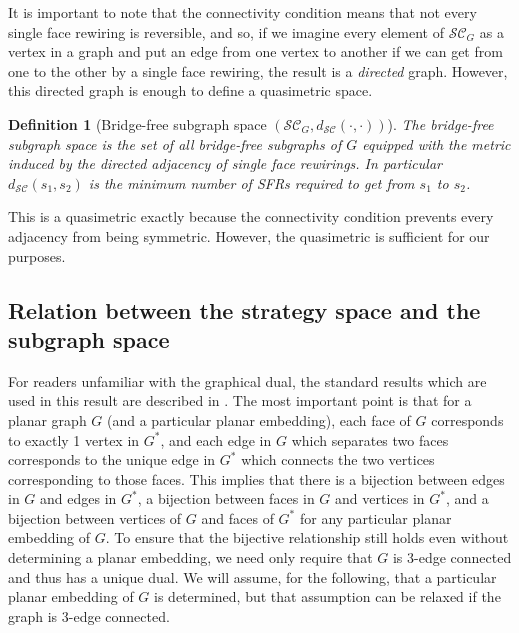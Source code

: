 \documentclass{article}
\newtheorem{definition}{Definition}[section]
\begin{document}
It is important to note that the connectivity condition means that not every single face rewiring is reversible, and so, if we imagine every element of $\mathcal{SC}_G$ as a vertex in a graph and put an edge from one vertex to another if we can get from one to the other by a single face rewiring, the result is a \textit{directed} graph. However, this directed graph is enough to define a quasimetric space. 

\begin{definition}[Bridge-free subgraph space $(\mathcal{SC}_G,d_{\mathcal{SC}}(\cdot,\cdot))$]
The bridge-free subgraph space is the set of all bridge-free subgraphs of $G$ equipped with the metric induced by the directed adjacency of single face rewirings. In particular $d_{\mathcal{SC}}(s_1,s_2)$ is the minimum number of SFRs required to get from $s_1$ to $s_2$. 
\end{definition}
This is a quasimetric exactly because the connectivity condition prevents every adjacency from being symmetric. However, the quasimetric is sufficient for our purposes.

\subsection{Relation between the strategy space and the subgraph space}

For readers unfamiliar with the graphical dual, the standard results which are used in this result are described in \cite{NishizekiPlanarGraphs}. The most important point is that for a planar graph $G$ (and a particular planar embedding), each face of $G$ corresponds to exactly 1 vertex in $G^*$, and each edge in $G$ which separates two faces corresponds to the unique edge in $G^*$ which connects the two vertices corresponding to those faces. This implies that there is a bijection between edges in $G$ and edges in $G^*$, a bijection between faces in $G$ and vertices in $G^*$, and a bijection between vertices of $G$ and faces of $G^*$ for any particular planar embedding of $G$. To ensure that the bijective relationship still holds even without determining a planar embedding, we need only require that $G$ is 3-edge connected and thus has a unique dual. We will assume, for the following, that a particular planar embedding of $G$ is determined, but that assumption can be relaxed if the graph is 3-edge connected. 
\end{document}
